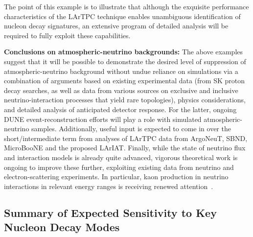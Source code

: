 The point of this example is to illustrate that although the 
exquisite performance characteristics of the LArTPC technique 
enables unambiguous identification of nucleon decay signatures, 
an extensive program of detailed analysis will be required 
to fully exploit these capabilities.

\textbf{Conclusions on atmospheric-neutrino backgrounds:}
The above examples suggest that it will be possible to demonstrate 
the desired level of suppression of atmospheric-neutrino background 
without undue reliance on simulations 
via a combination of arguments based on existing experimental data 
(from SK proton decay searches, as well as data from various 
sources on exclusive and inclusive neutrino-interaction processes 
that yield rare topologies), physics considerations, and detailed 
analysis of anticipated detector response.  For the latter, 
ongoing DUNE event-reconstruction efforts will play a role with 
simulated atmospheric-neutrino samples.  Additionally, useful 
input is expected to come in over the short/intermediate term 
from analyses of LArTPC data from ArgoNeuT, SBND, MicroBooNE and 
the proposed LArIAT.
Finally, while the state of neutrino flux and interaction models 
is already quite advanced, vigorous theoretical work is ongoing 
to improve these further, exploiting existing data from neutrino 
and electron-scattering experiments.  In particular, kaon production 
in neutrino interactions in relevant energy ranges is receiving 
renewed attention~\cite{gallagher-private}.
\clearpage
\subsection{\boldmath Summary of Expected Sensitivity to Key Nucleon Decay Modes}

